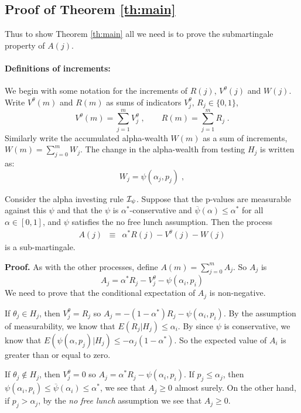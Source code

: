 \documentclass[12pt]{article}
\begin{document}
\subsection*{Proof of Theorem \ref{th:main}}

Thus to show Theorem \ref{th:main} all we need is to prove the
 submartingale property of $A(j)$. 

\paragraph{Definitions of increments:} 
We begin with some notation for the increments of  $R(j)$,
 $V^\theta(j)$ and $W(j)$.  Write $V^\theta(m)$ and $R(m)$ as sums of
 indicators $V^\theta_j,\, R_j \in \{0,1\}$,
\begin{displaymath}
   V^\theta(m) = \sum_{j=1}^m V^\theta_j \;, \qquad
   R(m) = \sum_{j=1}^m R_j \;.
\label{eq:sums}
\end{displaymath}
Similarly write the accumulated alpha-wealth $W(m)$ as a sum of
 increments, $W(m) = \sum_{j=0}^m W_j$.  The change in the
 alpha-wealth from testing $H_j$ is written as:
\begin{displaymath}
  W_j  =  \psi(\alpha_j,p_j)  \;,
\end{displaymath}

\newpage  %

\begin{lemma} \label{le:martingale} Consider the alpha investing rule
 ${\cal I}_{\psi}$.  Suppose that the p-values are measurable against
 this $\psi$ and that the $\psi$ is $\alpha^*$-conservative and
 $\overline{\psi}(\alpha) \le \alpha^*$ for all $\alpha \in [0,1]$,
 and $\psi$ satisfies the no free lunch assumption.  Then the process
\begin{eqnarray*}
    A(j)  &\equiv& \alpha^* R(j) - V^\theta(j) - W(j) 
\end{eqnarray*}
is a sub-martingale.
\end{lemma}

\noindent 
{\bf Proof.} 
As with the other processes, define $A(m) = \sum_{j=0}^m A_j$.
So $A_j$ is
\begin{displaymath}
   A_j  =  \alpha^* R_j -V^\theta_j - \psi(\alpha_i,p_i)
\end{displaymath}
We need to prove that the conditional expectation of $A_j$ is
 non-negative.

If $\theta_j \in H_j$, then $V^\theta_j = R_j$ so $A_j =
 -(1-\alpha^*)R_j - \psi(\alpha_i,p_i)$.  By the assumption of
 measurability, we know that $E(R_j|H_j) \le \alpha_i$.  By since
 $\psi$ is conservative, we know that $E(\psi(\alpha,p_j)|H_j) \le
 -\alpha_j(1-\alpha^*)$.  So the expected value of $A_i$ is greater
 than or equal to zero.

If $\theta_j \not\in H_j$, then $V^\theta_j = 0$ so $A_j = \alpha^*R_j
 - \psi(\alpha_i,p_i)$.  If $p_j \le \alpha_j$, then
 $\psi(\alpha_i,p_i) \le \overline{\psi}(\alpha_i) \le \alpha^*$, we
 see that $A_j \ge 0$ almost surely.  On the other hand, if $p_j >
 \alpha_j$, by the {\em no free lunch} assumption we see that $A_j \ge
 0$.

\hfill \QED
\end{document}
